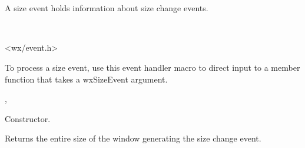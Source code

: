 

\section{}\label{wxsizeevent}

A size event holds information about size change events.


\\


<wx/event.h>


To process a size event, use this event handler macro to direct input to a member
function that takes a wxSizeEvent argument.

\twocolwidtha{7cm}
\begin{twocollist}\itemsep=0pt
\end{twocollist}%


,\rtfsp
{}




Constructor.

\label{wxsizeeventgetsize}


Returns the entire size of the window generating the size change event.

